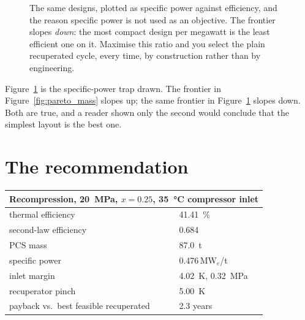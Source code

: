 \documentclass[11pt,a4paper]{report}
\begin{document}
\begin{figure}[htbp]
\centering
{}
\caption{The same designs, plotted as specific power against efficiency, and
the reason specific power is not used as an objective. The frontier slopes
\emph{down}: the most compact design per megawatt is the least efficient one
on it. Maximise this ratio and you select the plain recuperated cycle, every
time, by construction rather than by engineering.}
\label{fig:pareto_power}
\end{figure}

Figure~\ref{fig:pareto_power} is the specific-power trap drawn. The frontier in
Figure~\ref{fig:pareto_mass} slopes up; the same frontier in
Figure~\ref{fig:pareto_power} slopes down. Both are true, and a reader shown
only the second would conclude that the simplest layout is the best one.

\section{The recommendation}

\begin{center}
\begin{tabular}{ll}
\toprule
\multicolumn{2}{l}{\textbf{Recompression, \SI{20}{\mega\pascal},
$x = 0.25$, \SI{35}{\celsius} compressor inlet}} \\
\midrule
thermal efficiency & \SI{41.41}{\percent} \\
second-law efficiency & \num{0.684} \\
PCS mass & \SI{87.0}{\tonne} \\
specific power & \num{0.476}\,\si{\mega\watt}$_e$/\si{\tonne} \\
inlet margin & \SI{4.02}{\kelvin}, \SI{0.32}{\mega\pascal} \\
recuperator pinch & \SI{5.00}{\kelvin} \\
payback vs.\ best feasible recuperated & \num{2.3} years \\
\bottomrule
\end{tabular}
\end{center}
\end{document}
